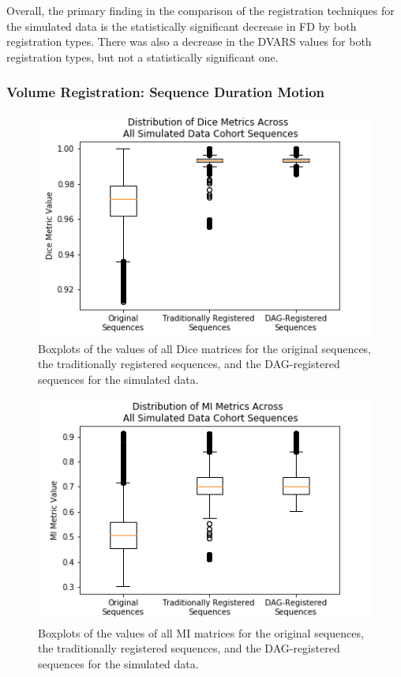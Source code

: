 Overall, the primary finding in the comparison of the registration techniques for the simulated data is the statistically significant decrease in FD by both registration types. There was also a decrease in the DVARS values for both registration types, but not a statistically significant one.

\subsubsection{Volume Registration: Sequence Duration Motion}

\begin{figure}
\centering
\includegraphics[height=0.3\textheight]{6/figures/spectr-dice-box.png}
\caption{Boxplots of the values of all Dice matrices for the original sequences, the traditionally registered sequences, and the DAG-registered sequences for the simulated data.}
\label{fig:spectr-dice-box}
\end{figure}

\begin{figure}
\centering
\includegraphics[height=0.3\textheight]{6/figures/spectr-mi-box.png}
\caption{Boxplots of the values of all MI matrices for the original sequences, the traditionally registered sequences, and the DAG-registered sequences for the simulated data.}
\label{fig:spectr-mi-box}
\end{figure}

